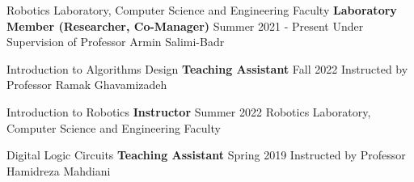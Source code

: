 \begin{cventries}

    \cventry
    {Robotics Laboratory, Computer Science and Engineering Faculty}
    {\bullet \space \textbf {Laboratory Member (Researcher, Co-Manager)}}
    {}
    {Summer 2021 - Present}
    {Under Supervision of Professor Armin Salimi-Badr}
    \vspace{0.4 cm}

    \cventry
    {Introduction to Algorithms Design}
    {\bullet \space \textbf {Teaching Assistant}}
    {}
    {Fall 2022}
    {Instructed by Professor Ramak Ghavamizadeh}
    \vspace{0.4 cm}
    
    \cventry
    {Introduction to Robotics}
    {\bullet \space \textbf {Instructor}}
    {}
    {Summer 2022}
    {Robotics Laboratory, Computer Science and Engineering Faculty}
    \vspace{0.4 cm}
    
    \cventry
    {Digital Logic Circuits}
    {\bullet \space \textbf {Teaching Assistant}}
    {}
    {Spring 2019}
    {Instructed by Professor Hamidreza Mahdiani}
    
\end{cventries}